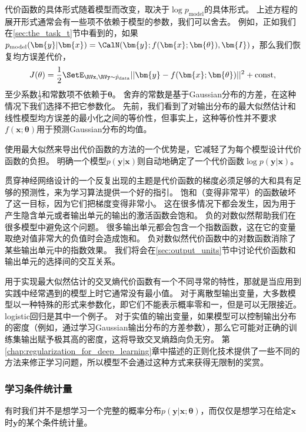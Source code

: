 代价函数的具体形式随着模型而改变，取决于$\log p_\text{model}$的具体形式。
上述方程的展开形式通常会有一些项不依赖于模型的参数，我们可以舍去。
例如，正如我们在\ref{sec:the_task_t}节中看到的，如果$p_\text{model}(\bm{y}|\bm{x}) = \CalN(\bm{y};f(\bm{x};\bm{\theta}), \bm{I})$，那么我们恢复均方误差代价，
\begin{equation}
J(\theta) = \frac{1}{2} \SetE_{\RVx, \RVy \sim  \hat{p}_\text{data}} || \bm{y} - f(\bm{x}; \bm{\theta}) ||^2 + \text{const},
\end{equation}
至少系数$\frac{1}{2}$和常数项不依赖于$\bm{\theta}$。
舍弃的常数是基于Gaussian分布的方差，在这种情况下我们选择不把它参数化。
先前，我们看到了对输出分布的最大似然估计和线性模型均方误差的最小化之间的等价性，但事实上，这种等价性并不要求$f(\bm{x}; \bm{\theta})$用于预测Gaussian分布的均值。

使用最大似然来导出代价函数的方法的一个优势是，它减轻了为每个模型设计代价函数的负担。
明确一个模型$p(\bm{y}|\bm{x})$则自动地确定了一个代价函数$\log p(\bm{y}|\bm{x})$。

贯穿神经网络设计的一个反复出现的主题是代价函数的梯度必须足够的大和具有足够的预测性，来为学习算法提供一个好的指引。
饱和（变得非常平）的函数破坏了这一目标，因为它们把梯度变得非常小。
这在很多情况下都会发生，因为用于产生隐含单元或者输出单元的输出的激活函数会饱和。
负的对数似然帮助我们在很多模型中避免这个问题。
很多输出单元都会包含一个指数函数，这在它的变量取绝对值非常大的负值时会造成饱和。
负对数似然代价函数中的对数函数消除了某些输出单元中的指数效果。
我们将会在\ref{sec:output_units}节中讨论代价函数和输出单元的选择间的交互关系。


用于实现最大似然估计的交叉熵代价函数有一个不同寻常的特性，那就是当应用到实践中经常遇到的模型上时它通常没有最小值。
对于离散型输出变量，大多数模型以一种特殊的形式来参数化，即它们不能表示概率零和一，但是可以无限接近。
logistic回归是其中一个例子。
对于实值的输出变量，如果模型可以控制输出分布的密度（例如，通过学习Gaussian输出分布的方差参数），那么它可能对正确的训练集输出赋予极其高的密度，这将导致交叉熵趋向负无穷。
第\ref{chap:regularization_for_deep_learning}章中描述的正则化技术提供了一些不同的方法来修正学习问题，所以模型不会通过这种方式来获得无限制的奖赏。

\subsubsection{学习条件统计量}
\label{sec:learning_conditional_statistics}

有时我们并不是想学习一个完整的概率分布$p(\bm{y}|\bm{x}; \bm{\theta})$，而仅仅是想学习在给定$\bm{x}$时$\bm{y}$的某个条件统计量。

